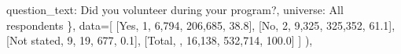 \documentclass[
  11pt,
  a4paper,
]{article}
\newenvironment{Shaded}{\begin{snugshade}}{\end{snugshade}}
\newcommand{\NormalTok}[1]{\textcolor[rgb]{0.00,0.23,0.31}{#1}}
\newcommand{\OperatorTok}[1]{\textcolor[rgb]{0.37,0.37,0.37}{#1}}
\newcommand{\StringTok}[1]{\textcolor[rgb]{0.13,0.47,0.30}{#1}}
\begin{document}
\begin{Shaded}
\begin{Highlighting}[]
                    \StringTok{\textquotesingle{}question\_text\textquotesingle{}}\NormalTok{: }\StringTok{\textquotesingle{}Did you volunteer during your program?\textquotesingle{}}\NormalTok{,}
                    \StringTok{\textquotesingle{}universe\textquotesingle{}}\NormalTok{: }\StringTok{\textquotesingle{}All respondents\textquotesingle{}}
\NormalTok{                \},}
\NormalTok{                data}\OperatorTok{=}\NormalTok{[}
\NormalTok{                    [}\StringTok{\textquotesingle{}Yes\textquotesingle{}}\NormalTok{, }\StringTok{\textquotesingle{}1\textquotesingle{}}\NormalTok{, }\StringTok{\textquotesingle{}6,794\textquotesingle{}}\NormalTok{, }\StringTok{\textquotesingle{}206,685\textquotesingle{}}\NormalTok{, }\StringTok{\textquotesingle{}38.8\textquotesingle{}}\NormalTok{],}
\NormalTok{                    [}\StringTok{\textquotesingle{}No\textquotesingle{}}\NormalTok{, }\StringTok{\textquotesingle{}2\textquotesingle{}}\NormalTok{, }\StringTok{\textquotesingle{}9,325\textquotesingle{}}\NormalTok{, }\StringTok{\textquotesingle{}325,352\textquotesingle{}}\NormalTok{, }\StringTok{\textquotesingle{}61.1\textquotesingle{}}\NormalTok{],}
\NormalTok{                    [}\StringTok{\textquotesingle{}Not stated\textquotesingle{}}\NormalTok{, }\StringTok{\textquotesingle{}9\textquotesingle{}}\NormalTok{, }\StringTok{\textquotesingle{}19\textquotesingle{}}\NormalTok{, }\StringTok{\textquotesingle{}677\textquotesingle{}}\NormalTok{, }\StringTok{\textquotesingle{}0.1\textquotesingle{}}\NormalTok{],}
\NormalTok{                    [}\StringTok{\textquotesingle{}Total\textquotesingle{}}\NormalTok{, }\StringTok{\textquotesingle{}\textquotesingle{}}\NormalTok{, }\StringTok{\textquotesingle{}16,138\textquotesingle{}}\NormalTok{, }\StringTok{\textquotesingle{}532,714\textquotesingle{}}\NormalTok{, }\StringTok{\textquotesingle{}100.0\textquotesingle{}}\NormalTok{]}
\NormalTok{                ]}
\NormalTok{            ),}


\end{Highlighting}
\end{Shaded}
\end{document}
